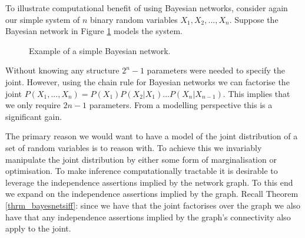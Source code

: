 To illustrate computational benefit of using Bayesian networks, consider again our simple system of $n$ binary random variables $X_1,X_2,...,X_n$. Suppose the Bayesian network in Figure \ref{fig_bnet} models the system.
\begin{figure}[H] 
\centering
{}
\caption{Example of a simple Bayesian network.}
\label{fig_bnet}
\end{figure}
Without knowing any structure $2^{n}-1$ parameters were needed to specify the joint. However, using the chain rule for Bayesian networks we can factorise the joint $P(X_1,...,X_n) = P(X_1)P(X_2|X_1)...P(X_n|X_{n-1})$. This implies that we only require $2n-1$ parameters. From a modelling perspective this is a significant gain.

The primary reason we would want to have a model of the joint distribution of a set of random variables is to reason with. To achieve this we invariably manipulate the joint distribution by either some form of marginalisation or optimisation. To make inference computationally tractable it is desirable to leverage the independence assertions implied by the network graph. To this end we expand on the independence assertions implied by the graph. Recall Theorem \ref{thrm_bayesnetsiff}: since we have that the joint factorises over the graph we also have that any independence assertions implied by the graph's connectivity also apply to the joint.

